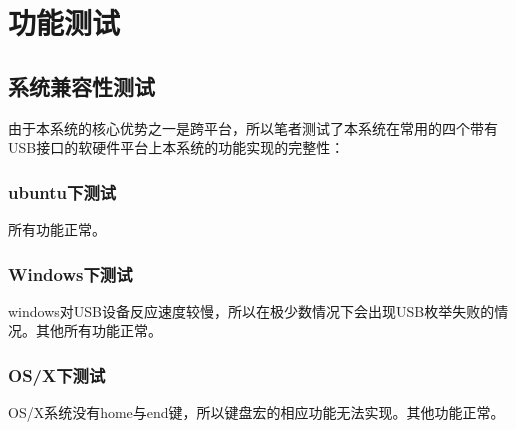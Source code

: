 
\chapter{功能测试}
\section{系统兼容性测试}
由于本系统的核心优势之一是跨平台，所以笔者测试了本系统在常用的四个带有USB接口的软硬件平台上本系统的功能实现的完整性：
\subsection{ubuntu下测试}
所有功能正常。
\subsection{Windows下测试}
windows对USB设备反应速度较慢，所以在极少数情况下会出现USB枚举失败的情况。其他所有功能正常。
\subsection{OS/X下测试}
OS/X系统没有home与end键，所以键盘宏的相应功能无法实现。其他功能正常。



